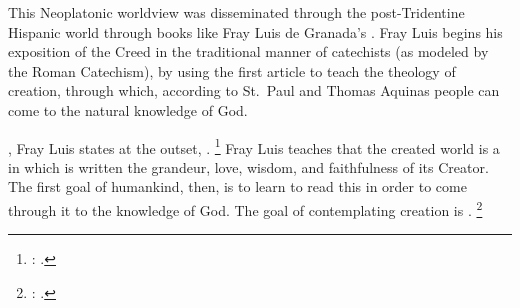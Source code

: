 This Neoplatonic worldview was disseminated through the post-Tridentine Hispanic world through books like Fray Luis de Granada's .
Fray Luis begins his exposition of the Creed in the traditional manner of catechists (as modeled by the Roman Catechism), by using the first article to teach the theology of creation, through which, according to St.~Paul and Thomas Aquinas people can come to the natural knowledge of God.

, Fray Luis states at the outset, .%
	\footnote{%
	\Autocite[182]{LuisdeGranada:Simbolo}: .
	}
Fray Luis teaches that the created world is a  in which is written the grandeur, love, wisdom, and faithfulness of its Creator.
The first goal of humankind, then, is to learn to read this  in order to come through it to the knowledge of God. 
The goal of contemplating creation is .%
	\footnote{%
	\Autocite[184]{LuisdeGranada:Simbolo}: .
	}

